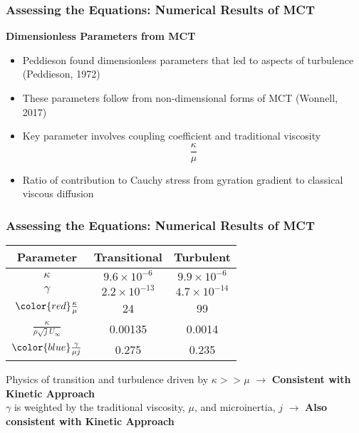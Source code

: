 \documentclass{beamer}
\begin{document}
\begin{frame}
 \frametitle{Assessing the Equations: Numerical Results of MCT}
 \textbf{Dimensionless Parameters from MCT}\\
 \Large
 \begin{itemize}
 \item Peddieson found dimensionless parameters that led to aspects of 
turbulence (Peddieson, 1972)
 \pause
 \item These parameters follow from non-dimensional forms of MCT (Wonnell, 2017)
 \pause
 \item Key parameter involves coupling coefficient and traditional viscosity
$$\frac{\kappa}{\mu}$$ 
 \pause
 \item Ratio of contribution to Cauchy stress from gyration gradient to 
classical viscous diffusion 
\end{itemize}
\end{frame}
\begin{frame}
\frametitle{Assessing the Equations: Numerical Results of MCT}
 \begin{table}[h!]
\centering
 \begin{tabular}{||c c c||} 
 \hline
 Parameter & Transitional & Turbulent \\ [0.7ex] 
 \hline\hline
 $ \kappa$ & $9.6 \times 10^{-6}$ & $9.9 \times 10^{-6}$ \\ 
 $ \gamma$ & $2.2 \times 10^{-13}$ & $4.7 \times 10^{-14}$ \\
 ${\color{red} \frac{\kappa}{\mu}}$ & {\color{red} 24 } & {\color{red} 99} \\
 $\frac{\kappa}{\rho\sqrt{j}U_{\infty}}$ & 0.00135 & 0.0014 \\
 ${\color{blue} \frac{\gamma}{\mu j}}$  & 0.275 & 0.235 \\ [1ex] 
 \hline
 \end{tabular}
\label{table:material}
\end{table}
\pause
\Large
Physics of transition and turbulence driven by $\kappa >> \mu$ 
\pause $\rightarrow$ \textbf{Consistent with Kinetic Approach}\\
\pause
$\gamma$ is weighted by the traditional viscosity, $\mu$, and microinertia, $j$ 
\pause $\rightarrow$ \textbf{Also consistent with Kinetic Approach}
\end{frame}
\end{document}
